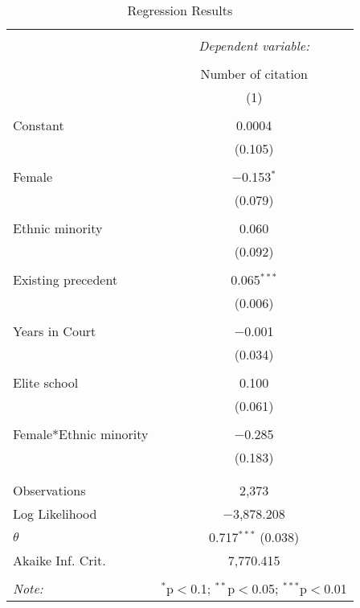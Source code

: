 
\begin{table}[!htbp] \centering 
  \caption{Regression Results} 
  \label{} 
\begin{tabular}{@{\extracolsep{5pt}}lc} 
\\[-1.8ex]\hline 
\hline \\[-1.8ex] 
 & \multicolumn{1}{c}{\textit{Dependent variable:}} \\ 
\cline{2-2} 
\\[-1.8ex] & Number of citation \\ 
 & (1) \\ 
\hline \\[-1.8ex] 
 Constant & 0.0004 \\ 
  & (0.105) \\ 
  & \\ 
 Female & $-$0.153$^{*}$ \\ 
  & (0.079) \\ 
  & \\ 
 Ethnic minority & 0.060 \\ 
  & (0.092) \\ 
  & \\ 
 Existing precedent & 0.065$^{***}$ \\ 
  & (0.006) \\ 
  & \\ 
 Years in Court & $-$0.001 \\ 
  & (0.034) \\ 
  & \\ 
 Elite school & 0.100 \\ 
  & (0.061) \\ 
  & \\ 
 Female*Ethnic minority & $-$0.285 \\ 
  & (0.183) \\ 
  & \\ 
\hline \\[-1.8ex] 
Observations & 2,373 \\ 
Log Likelihood & $-$3,878.208 \\ 
$\theta$ & 0.717$^{***}$  (0.038) \\ 
Akaike Inf. Crit. & 7,770.415 \\ 
\hline 
\hline \\[-1.8ex] 
\textit{Note:}  & \multicolumn{1}{r}{$^{*}$p$<$0.1; $^{**}$p$<$0.05; $^{***}$p$<$0.01} \\ 
\end{tabular} 
\end{table} 
